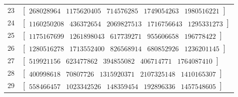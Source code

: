 \begin{longtable}{@{}cl@{}}
23 & $\begin{bmatrix}268028964 & 1175620405 & 714576285 & 1749054263 & 1980516221\end{bmatrix}$ \\
24 & $\begin{bmatrix}1160250208 & 436372654 & 2069827513 & 1716756643 & 1295331273\end{bmatrix}$ \\
25 & $\begin{bmatrix}1175167699 & 1261898043 & 617739271 & 955606658 & 196778422\end{bmatrix}$ \\
26 & $\begin{bmatrix}1280516278 & 1713552400 & 826568914 & 680852926 & 1236201145\end{bmatrix}$ \\
27 & $\begin{bmatrix}519921156 & 623477862 & 394855082 & 406714771 & 1764087410\end{bmatrix}$ \\
28 & $\begin{bmatrix}400998618 & 70807726 & 1315920371 & 2107325148 & 1410165307\end{bmatrix}$ \\
29 & $\begin{bmatrix}558466457 & 1023342526 & 148359454 & 192896336 & 1457548605\end{bmatrix}$ \\
\bottomrule
\end{longtable}
